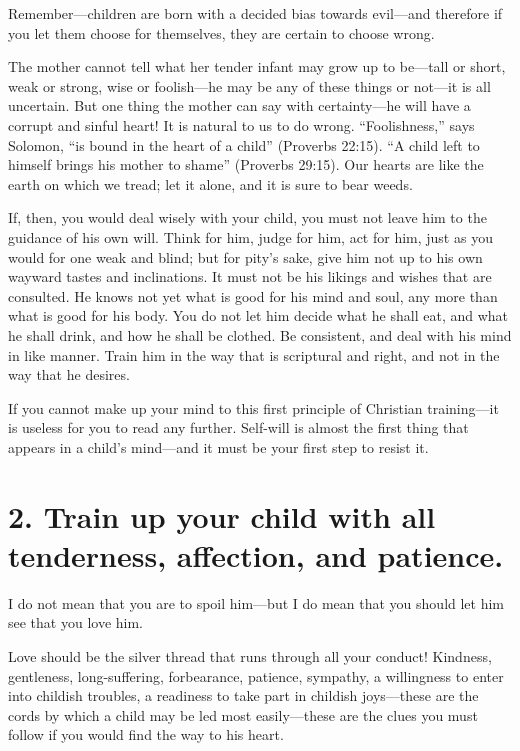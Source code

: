 \documentclass[
]{book}
\begin{document}
Remember---children are born with a decided bias towards evil---and therefore if you let them choose for themselves, they are certain to choose wrong.

The mother cannot tell what her tender infant may grow up to be---tall or short, weak or strong, wise or foolish---he may be any of these things or not---it is all uncertain. But one thing the mother can say with certainty---he will have a corrupt and sinful heart! It is natural to us to do wrong. ``Foolishness,'' says Solomon, ``is bound in the heart of a child'' (Proverbs 22:15). ``A child left to himself brings his mother to shame'' (Proverbs 29:15). Our hearts are like the earth on which we tread; let it alone, and it is sure to bear weeds.

If, then, you would deal wisely with your child, you must not leave him to the guidance of his own will. Think for him, judge for him, act for him, just as you would for one weak and blind; but for pity's sake, give him not up to his own wayward tastes and inclinations. It must not be his likings and wishes that are consulted. He knows not yet what is good for his mind and soul, any more than what is good for his body. You do not let him decide what he shall eat, and what he shall drink, and how he shall be clothed. Be consistent, and deal with his mind in like manner. Train him in the way that is scriptural and right, and not in the way that he desires.

If you cannot make up your mind to this first principle of Christian training---it is useless for you to read any further. Self-will is almost the first thing that appears in a child's mind---and it must be your first step to resist it.

\hypertarget{train-up-your-child-with-all-tenderness-affection-and-patience.}{%
\section*{2. Train up your child with all tenderness, affection, and patience.}\label{train-up-your-child-with-all-tenderness-affection-and-patience.}}

I do not mean that you are to spoil him---but I do mean that you should let him see that you love him.

Love should be the silver thread that runs through all your conduct! Kindness, gentleness, long-suffering, forbearance, patience, sympathy, a willingness to enter into childish troubles, a readiness to take part in childish joys---these are the cords by which a child may be led most easily---these are the clues you must follow if you would find the way to his heart.
\end{document}
